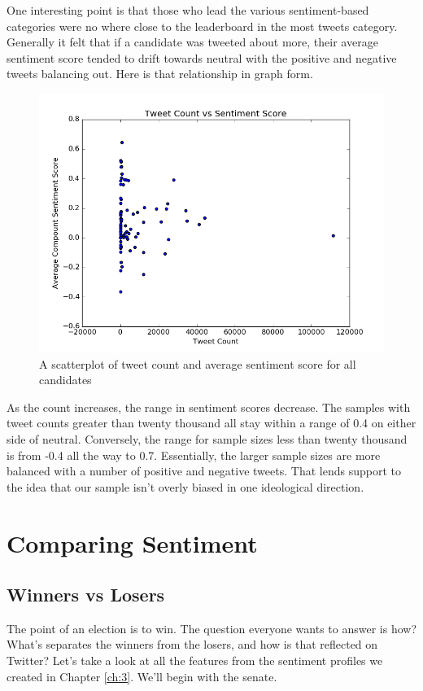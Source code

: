 \documentclass[11pt, twoside, reqno]{book}
\begin{document}
One interesting point is that those who lead the various sentiment-based categories were no where close to the leaderboard in the most tweets category. Generally it felt that if a candidate was tweeted about more, their average sentiment score tended to drift towards neutral with the positive and negative tweets balancing out. Here is that relationship in graph form. 
\begin{figure}[H]
\centering
	\includegraphics[scale=0.5]{count_sentiment}
	\caption{A scatterplot of tweet count and average sentiment score for all candidates}\label{fig:count_sentiment}
\end{figure}
As the count increases, the range in sentiment scores decrease. The samples with tweet counts greater than twenty thousand all stay within a range of 0.4 on either side of neutral. Conversely, the range for sample sizes less than twenty thousand is from -0.4 all the way to 0.7. Essentially, the larger sample sizes are more balanced with a number of positive and negative tweets. That lends support to the idea that our sample isn't overly biased in one ideological direction. 
\section{Comparing Sentiment}

\subsection{Winners vs Losers}
\hspace{0.2in}The point of an election is to win. The question everyone wants to answer is how? What's separates the winners from the losers, and how is that reflected on Twitter? Let's take a look at all the features from the sentiment profiles we created in Chapter \ref{ch:3}. We'll begin with the senate. 
\end{document}

